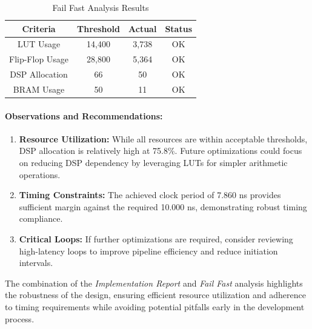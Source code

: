 \documentclass{article}
\begin{document}
\begin{table}[h]
    \centering
    \begin{tabular}{|c|c|c|c|}
        \hline
        \textbf{Criteria} & \textbf{Threshold} & \textbf{Actual} & \textbf{Status} \\
        \hline
        LUT Usage         & 14,400             & 3,738           & OK \\
        Flip-Flop Usage   & 28,800             & 5,364           & OK \\
        DSP Allocation    & 66                 & 50              & OK \\
        BRAM Usage        & 50                 & 11              & OK \\
        \hline
    \end{tabular}
    \caption{Fail Fast Analysis Results}
    \label{tab:failfast-results}
\end{table}

\paragraph{Observations and Recommendations:}
\begin{enumerate}
    \item \textbf{Resource Utilization:} While all resources are within acceptable thresholds, DSP allocation is relatively high at 75.8\%. Future optimizations could focus on reducing DSP dependency by leveraging LUTs for simpler arithmetic operations.
    \item \textbf{Timing Constraints:} The achieved clock period of 7.860 ns provides sufficient margin against the required 10.000 ns, demonstrating robust timing compliance.
    \item \textbf{Critical Loops:} If further optimizations are required, consider reviewing high-latency loops to improve pipeline efficiency and reduce initiation intervals.
\end{enumerate}

The combination of the \textit{Implementation Report} and \textit{Fail Fast} analysis highlights the robustness of the design, ensuring efficient resource utilization and adherence to timing requirements while avoiding potential pitfalls early in the development process.
\end{document}
